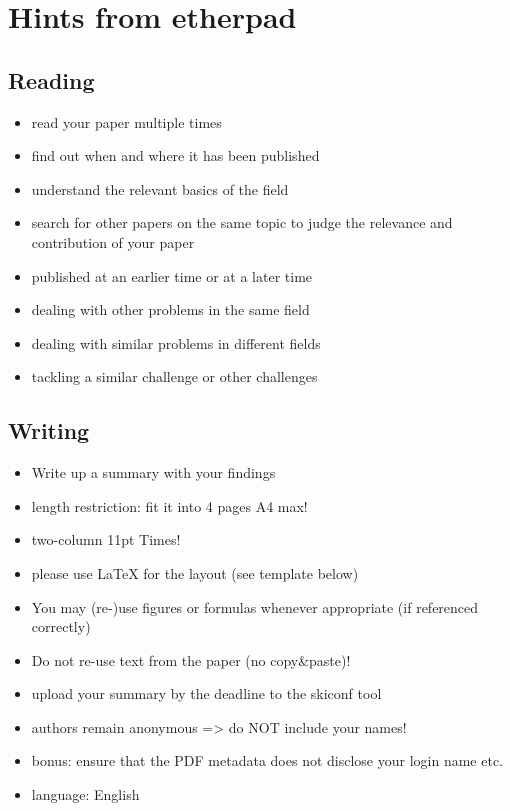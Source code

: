 \section*{Hints from etherpad}
	\subsection{Reading}

	\begin{itemize}
		\item read your paper multiple times
	   \item find out when and where it has been published
	   \item understand the relevant basics of the field
	   \item search for other papers on the same topic to judge the relevance and contribution of your paper
	     \item published at an earlier time or at a later time
	     \item dealing with other problems in the same field
	     \item dealing with similar problems in different fields
	     \item tackling a similar challenge or other challenges
	\end{itemize}

\subsection{Writing}

\begin{itemize}
	\item Write up a summary with your findings
   \item length restriction: fit it into 4 pages A4 max!
   \item two-column 11pt Times!
   \item please use LaTeX for the layout (see template below)

   \item You may (re-)use figures or formulas whenever appropriate (if referenced correctly)
   \item Do not re-use text from the paper (no copy\&paste)!

   \item upload your summary by the deadline to the skiconf tool
     \item authors remain anonymous => do NOT include your names!
     \item bonus: ensure that the PDF metadata does not disclose your login name etc.
   \item language: English
\end{itemize}

